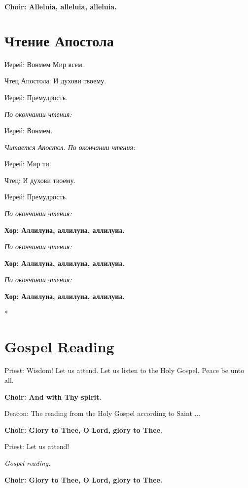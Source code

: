 \documentclass[12pt,a4paper,titlepage]{report}
\begin{document}
\begin{paracol}[1]{2}
  \textbf{Choir: Alleluia, alleluia, alleluia.}

  \switchcolumn[1]

  \section*{Чтение Апостола}

  Иерей: Вонмем Мир всем.

  Чтец Апостола: И духови твоему.

  Иерей: Премудрость.

  \indent \textit{По окончании чтения:}

  Иерей: Вонмем.

  \indent \textit{Читается Апостол. По окончании чтения:}

  Иерей: Мир ти.

  Чтец:  И духови твоему.

  Иерей: Премудрость.

  \textit{По окончании чтения:}

  \textbf{Хор: Аллилуиа, аллилуиа, аллилуиа.}

  \textit{По окончании чтения:}

  \textbf{Хор: Аллилуиа, аллилуиа, аллилуиа.}

  \textit{По окончании чтения:}

  \textbf{Хор: Аллилуиа, аллилуиа, аллилуиа.}

  \switchcolumn[0]*

  \section*{Gospel Reading}

  Priest: Wisdom! Let us attend. Let us listen to the Holy Gospel. Peace be unto all.

  \textbf{Choir: And with Thy spirit.}

  Deacon: The reading from the Holy Gospel according to Saint ...

  \textbf{Choir: Glory to Thee, O Lord, glory to Thee.}

  Priest: Let us attend!

  \indent \textit{Gospel reading.}

  \textbf{Choir: Glory to Thee, O Lord, glory to Thee.}


\end{paracol}
\end{document}
